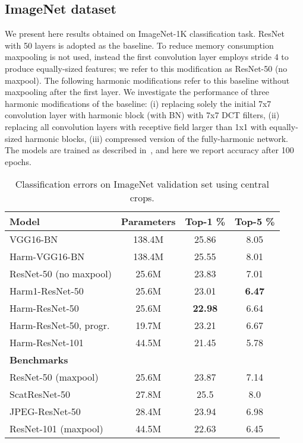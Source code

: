\documentclass[12pt,a4paper]{article}
\begin{document}
\subsection{ImageNet dataset} 
\label{sec:experiments.imagenet}

We present here results obtained on ImageNet-1K classification task.
ResNet~\cite{He16} with 50 layers is adopted as the baseline. 
To reduce memory consumption maxpooling is not used, instead the first convolution layer employs stride 4 to produce equally-sized features; we refer to this modification as ResNet-50 (no maxpool). The following harmonic modifications refer to this baseline without maxpooling after the first layer. We investigate the performance of three harmonic modifications of the baseline: (i) replacing solely the initial 7x7 convolution layer with harmonic block (with BN) with 7x7 DCT filters, (ii) replacing all convolution layers with receptive field larger than 1x1 with equally-sized harmonic blocks, (iii) compressed version of the fully-harmonic network.
The models are trained as described in~\cite{Ulicny19b}, and here we report accuracy after 100 epochs.

\begin{table}[h]
\caption{Classification errors on ImageNet validation set using central crops.} 
\label{tab:imagenet_spec}
\vspace{0.3\baselineskip}
\centering
\begin{tabular}{ l c c c }
\hline
 \textbf{Model} & \textbf{Parameters}  & \textbf{Top-1 \%}  & \textbf{Top-5 \%}  \\
\hline
 VGG16-BN & 138.4M & 25.86 & 8.05 \\
 Harm-VGG16-BN & 138.4M & 25.55 & 8.01 \\
 ResNet-50 (no maxpool) & 25.6M & 23.83 & 7.01 \\
 Harm1-ResNet-50 & 25.6M & 23.01 & \textbf{6.47} \\
 Harm-ResNet-50 & 25.6M & \textbf{22.98} & 6.64 \\
 Harm-ResNet-50, progr.  & 19.7M & 23.21 & 6.67 \\
 Harm-ResNet-101 & 44.5M & 21.45 & 5.78 \\

\hline
{\bf Benchmarks}\\
 ResNet-50 (maxpool)~\cite{ResNetPyTorch} & 25.6M & 23.87 & 7.14 \\
 ScatResNet-50~\cite{Oyallon18b} & 27.8M & 25.5 & 8.0 \\
 JPEG-ResNet-50~\cite{Gueguen18} & 28.4M & 23.94 & 6.98 \\
 ResNet-101 (maxpool)~\cite{ResNetPyTorch} & 44.5M & 22.63 & 6.45 \\
\hline
\end{tabular}
\end{table}
\end{document}
